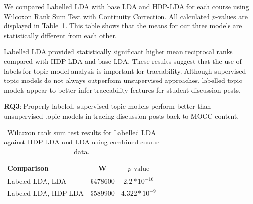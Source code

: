\documentclass[sigconf, nonacm=true]{acmart}
\begin{document}
We compared Labelled LDA with base LDA and HDP-LDA for each course using Wilcoxon Rank Sum Test with Continuity Correction.
All calculated $p$-values are displayed in Table~\ref{tab:sup-unsup-test}.
This table shows that the means for our three models are statistically different from each other.

Labelled LDA provided statistically significant higher mean reciprocal ranks compared with HDP-LDA and base LDA.
These results suggest that the use of labels for topic model analysis is important for traceability.
Although supervised topic models do not always outperform unsupervised approaches, labelled topic models appear to better infer traceability features for student discussion posts.

\begin{tcolorbox}[sharp corners, top=1mm, bottom=1mm]
\textbf{RQ3}: Properly labeled, supervised topic models perform better than unsupervised topic models in tracing discussion posts back to MOOC content.
\end{tcolorbox}

\begin{table}
    \centering
    \begin{tabular}{l*{2}{c}}
    \toprule
    Comparison & W & $p\text{-value}$ \\
    \midrule
    Labeled LDA, LDA & 6478600 & $2.2*10^{-16}$ \\
    Labeled LDA, HDP-LDA & 5589900 & $4.322*10^{-9}$ \\
    \bottomrule
    \end{tabular}
    \caption{Wilcoxon rank sum test results for Labelled LDA against HDP-LDA and LDA using combined course data.}
    \label{tab:sup-unsup-test}
\end{table}
\end{document}
